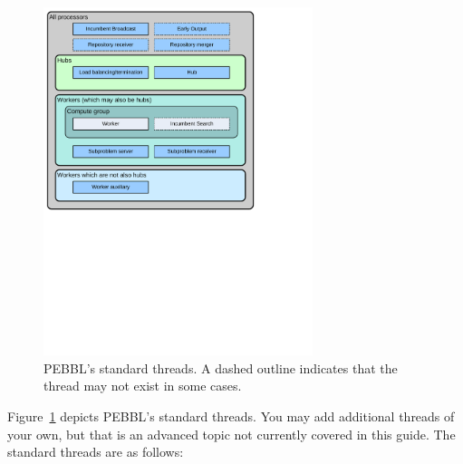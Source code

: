 \begin{figure}[tbp]
\begin{center}
\includegraphics[width=0.7\textwidth]{threads-new}
\vspace{-0.2in}
\end{center}
\caption{PEBBL's standard threads.  A dashed outline
indicates that the thread may not exist in some cases.}
\label{fig:threads}
\end{figure}

Figure~\ref{fig:threads} depicts PEBBL's standard threads. You may add
additional threads of your own, but that is an advanced topic not
currently covered in this guide.  The standard threads are as follows:

